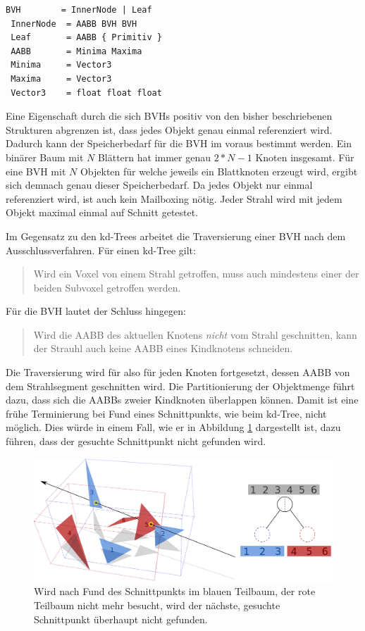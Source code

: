 \begin{lstlisting}[float,caption=Beschreibung einer binären BVH Datenstruktur in erweiterter Backus-""Naur-""Form,label=bvhdef]
 BVH        = InnerNode | Leaf
 InnerNode  = AABB BVH BVH
 Leaf       = AABB { Primitiv }
 AABB       = Minima Maxima
 Minima     = Vector3
 Maxima     = Vector3
 Vector3    = float float float
\end{lstlisting}

Eine Eigenschaft durch die sich BVHs positiv von den bisher beschriebenen Strukturen abgrenzen ist, dass jedes Objekt genau einmal referenziert wird. Dadurch kann der Speicherbedarf für die BVH im voraus bestimmt werden. Ein binärer Baum mit $N$ Blättern hat immer genau $2*N - 1$ Knoten insgesamt. Für eine BVH mit $N$ Objekten für welche jeweils ein Blattknoten erzeugt wird, ergibt sich demnach genau dieser Speicherbedarf.
Da jedes Objekt nur einmal referenziert wird, ist auch kein Mailboxing nötig. Jeder Strahl wird mit jedem Objekt maximal einmal auf Schnitt getestet.

Im Gegensatz zu den kd-Trees arbeitet die Traversierung einer BVH nach dem Ausschlussverfahren. Für einen kd-Tree gilt:
\begin{quote}
Wird ein Voxel von einem Strahl getroffen, muss auch mindestens einer der beiden Subvoxel getroffen werden.\end{quote} 
Für die BVH lautet der Schluss hingegen:
\begin{quote}
Wird die AABB des aktuellen Knotens \textit{nicht} vom Strahl geschnitten, kann der Strauhl auch keine AABB eines Kindknotens schneiden.\end{quote} 
Die Traversierung wird für also für jeden Knoten fortgesetzt, dessen AABB von dem Strahlsegment geschnitten wird.
Die Partitionierung der Objektmenge führt dazu, dass sich die AABBs zweier Kindknoten überlappen können. Damit ist eine frühe Terminierung bei Fund eines Schnittpunkts, wie beim kd-Tree, nicht möglich. Dies würde in einem Fall, wie er in Abbildung \ref{fig:bvhoverlap} dargestellt ist, dazu führen, dass der gesuchte Schnittpunkt nicht gefunden wird.

\begin{figure}\centering
\includegraphics[width=1.0\textwidth]{images/bvh.pdf} 
\caption[Keine frühe Terminierung für BVHs]{Wird nach Fund des Schnittpunkts im blauen Teilbaum, der rote Teilbaum nicht mehr besucht, wird der nächste, gesuchte Schnittpunkt überhaupt nicht gefunden.}
\label{fig:bvhoverlap}
\end{figure}

